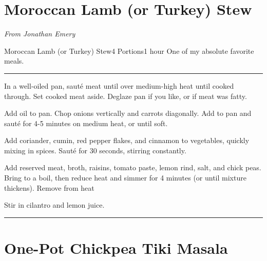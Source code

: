 \documentclass[openany]{book}
\begin{document}
\chapter{Moroccan Lamb (or Turkey)
Stew}\label{moroccan-lamb-or-turkey-stew}

\emph{From Jonathan Emery}

\begin{recipe}[MoroccanStew]{Moroccan Lamb (or Turkey) Stew}{4 Portions}{1 hour}
\freeform One of my absolute favorite meals.
\freeform\rule{\textwidth}{0.05pt}

In a well-oiled pan, saut\'{e} meat until over medium-high heat until cooked through. Set cooked meat aside. Deglaze pan if you like, or if meat was fatty.


Add oil to pan. Chop onions vertically and carrots diagonally. Add to pan and saut\'{e} for 4-5 minutes on medium heat, or until soft.


Add coriander, cumin, red pepper flakes, and cinnamon to vegetables, quickly mixing in spices. Saut\'{e} for 30 seconds, stirring constantly.


Add reserved meat, broth, raisins, tomato paste, lemon rind, salt, and chick peas. Bring to a boil, then reduce heat and simmer for 4 minutes (or until mixture thickens). Remove from heat


Stir in cilantro and lemon juice.


\freeform\rule{\textwidth}{0.05pt}

\end{recipe}

\chapter{One-Pot Chickpea Tiki
Masala}\label{one-pot-chickpea-tiki-masala}
\end{document}
